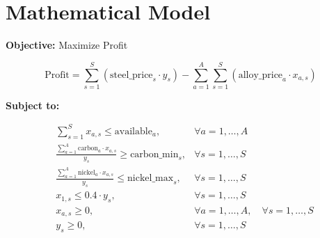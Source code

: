 \documentclass{article}
\begin{document}
\section*{Mathematical Model}

\textbf{Objective:} Maximize Profit

\[
\text{Profit} = \sum_{s=1}^{S} \left( \text{steel\_price}_s \cdot y_s \right) - \sum_{a=1}^{A} \sum_{s=1}^{S} \left( \text{alloy\_price}_a \cdot x_{a,s} \right)
\]

\textbf{Subject to:}

\begin{align*}
& \sum_{s=1}^{S} x_{a,s} \leq \text{available}_a, & \forall a = 1, \ldots, A \\
& \frac{\sum_{a=1}^{A} \text{carbon}_a \cdot x_{a,s}}{y_s} \geq \text{carbon\_min}_s, & \forall s = 1, \ldots, S \\
& \frac{\sum_{a=1}^{A} \text{nickel}_a \cdot x_{a,s}}{y_s} \leq \text{nickel\_max}_s, & \forall s = 1, \ldots, S \\
& x_{1,s} \leq 0.4 \cdot y_s, & \forall s = 1, \ldots, S \\
& x_{a,s} \geq 0, & \forall a = 1, \ldots, A, \quad \forall s = 1, \ldots, S \\
& y_s \geq 0, & \forall s = 1, \ldots, S
\end{align*}
\end{document}
